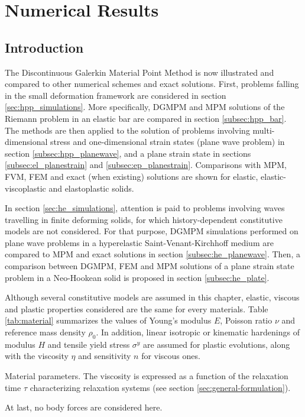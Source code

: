 \chapter{Numerical Results}
\section*{Introduction}
The Discontinuous Galerkin Material Point Method is now illustrated and compared to other numerical schemes and exact solutions. 
First, problems falling in the small deformation framework are considered in section \ref{sec:hpp_simulations}. More specifically, DGMPM and MPM solutions of the Riemann problem in an elastic bar are compared in section \ref{subsec:hpp_bar}. The methods are then applied to the solution of problems involving multi-dimensional stress and one-dimensional strain states (plane wave problem) in section \ref{subsec:hpp_planewave}, and a plane strain state in sections \ref{subsec:el_planestrain} and \ref{subsec:ep_planestrain}. Comparisons with MPM, FVM, FEM and exact (when existing) solutions are shown for elastic, elastic-viscoplastic and elastoplastic solids.

In section \ref{sec:he_simulations}, attention is paid to problems involving waves travelling in finite deforming solids, for which history-dependent constitutive models are not considered.
For that purpose, DGMPM simulations performed on plane wave problems in a hyperelastic Saint-Venant-Kirchhoff medium are compared to MPM and exact solutions in section \ref{subsec:he_planewave}. Then, a comparison between DGMPM, FEM and MPM solutions of a plane strain state problem in a Neo-Hookean solid is proposed in section \ref{subsec:he_plate}.

Although several constitutive models are assumed in this chapter, elastic, viscous and plastic properties considered are the same for every materials. Table \ref{tab:material} summarizes the values of Young's modulus $E$, Poisson ratio $\nu$ and reference mass density $\rho_0$.
In addition, linear isotropic or kinematic hardenings of modulus $H$ and tensile yield stress $\sigma^y$ are assumed for plastic evolutions, along with the viscosity $\eta$ and sensitivity $n$ for viscous ones.
\begin{table}[h!]
  \centering
  
  \caption{Material parameters. The viscosity is expressed as a function of the relaxation time $\tau$ characterizing relaxation systems (see section \ref{sec:general-formulation}).}
  \label{tab:material}
\end{table}
At last, no body forces are considered here.
